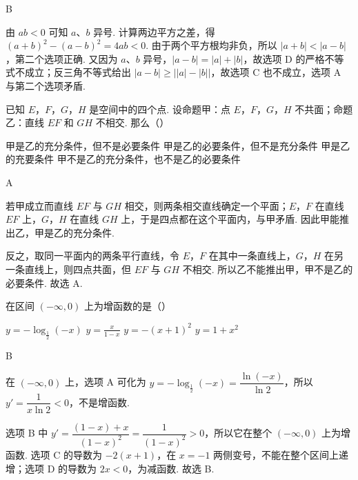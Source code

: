 \documentclass[UTF8,a4paper,oneside,11pt]{ctexbook}
\begin{document}
\begin{answer}
B
\end{answer}

\begin{solution}
由 \(ab<0\) 可知 \(a\)、\(b\) 异号. 计算两边平方之差，得
\((a+b)^2-(a-b)^2=4ab<0\). 由于两个平方根均非负，所以 \(|a+b|<|a-b|\)，第二个选项正确. 又因为 \(a\)、\(b\) 异号，\(|a-b|=|a|+|b|\)，故选项 D 的严格不等式不成立；反三角不等式给出 \(|a-b|\geqslant\bigl||a|-|b|\bigr|\)，故选项 C 也不成立，选项 A 与第二个选项矛盾.
\end{solution}

\begin{problem}

已知 \(E\)，\(F\)，\(G\)，\(H\) 是空间中的四个点. 设命题甲：点 \(E\)，\(F\)，\(G\)，\(H\) 不共面；命题乙：直线 \(EF\) 和 \(GH\) 不相交. 那么（\quad）

\choices
    {甲是乙的充分条件，但不是必要条件}
    {甲是乙的必要条件，但不是充分条件}
    {甲是乙的充要条件}
    {甲不是乙的充分条件，也不是乙的必要条件}
\end{problem}

\begin{answer}
A
\end{answer}

\begin{solution}
若甲成立而直线 \(EF\) 与 \(GH\) 相交，则两条相交直线确定一个平面；\(E\)，\(F\) 在直线 \(EF\) 上，\(G\)，\(H\) 在直线 \(GH\) 上，于是四点都在这个平面内，与甲矛盾. 因此甲能推出乙，甲是乙的充分条件.

反之，取同一平面内的两条平行直线，令 \(E\)，\(F\) 在其中一条直线上，\(G\)，\(H\) 在另一条直线上，则四点共面，但 \(EF\) 与 \(GH\) 不相交. 所以乙不能推出甲，甲不是乙的必要条件. 故选 A.
\end{solution}

\begin{problem}

在区间 \((-\infty,0)\) 上为增函数的是（\quad）

\choices
    {\(y = -\log_{\frac{1}{2}}\left(-x\right)\)}
    {\(y = \frac{x}{1 - x}\)}
    {\(y = -(x + 1)^2\)}
    {\(y = 1 + x^2\)}
\end{problem}

\begin{answer}
B
\end{answer}

\begin{solution}
在 \((-\infty,0)\) 上，选项 A 可化为
\(y=-\log_{\frac12}\left(-x\right)=\dfrac{\ln\left(-x\right)}{\ln2}\)，所以 \(y'=\dfrac{1}{x\ln2}<0\)，不是增函数.

选项 B 中
\(y'=\dfrac{(1-x)+x}{(1-x)^2}=\dfrac{1}{(1-x)^2}>0\)，所以它在整个 \((-\infty,0)\) 上为增函数. 选项 C 的导数为 \(-2(x+1)\)，在 \(x=-1\) 两侧变号，不能在整个区间上递增；选项 D 的导数为 \(2x<0\)，为减函数. 故选 B.
\end{solution}
\end{document}
